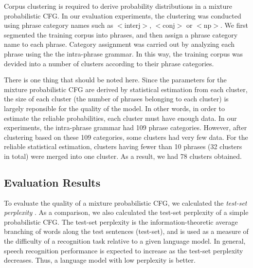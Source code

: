 Corpus clustering is required to derive probability distributions
in a mixture probabilistic CFG.
In our evaluation experiments,
the clustering was conducted using phrase category names
such as \hspace*{1mm}$<$interj$>$\hspace*{1mm}, \hspace*{1mm}$<$conj$>$\hspace*{1mm} or \hspace*{1mm}$<$np$>$\hspace*{1mm}.
We first segmented the training corpus into phrases,
and then assign a phrase category name to each phrase.
Category assignment was carried out by analyzing
each phrase using the the intra-phrase grammar.
In this way,
the training corpus was devided into a number of clusters
according to their phrase categories.

There is one thing that should be noted here.
Since the parameters for the mixture probabilistic CFG
are derived by statistical estimation from each cluster,
the size of each cluster (the number of phrases belonging to each cluster)
is largely reponsible for the quality of the model.
In other words, in order to estimate the reliable probabilities,
each cluster must have enough data.
In our experiments,
the intra-phrase grammar had 109 phrase categories.
However, after clustering based on these 109 categories,
some clusters had very few data.
For the reliable statistical estimation,
clusters having fewer than 10 phrases (32 clusters in total)
were merged into one cluster.
As a result, we had 78 clusters obtained.


\subsection{Evaluation Results}

To evaluate the quality of a mixture probabilistic CFG,
we calculated the {\em test-set perplexity} \cite{Lee89}.
As a comparison, we also calculated the test-set perplexity
of a simple probabilistic CFG.
The test-set perplexity is the information-theoretic average branching
of words along the test sentences (test-set),
and is used as a measure of the difficulty of a recognition task
relative to a given language model.
In general, speech recognition performance is expected to increase
as the test-set perplexity decreases.
Thus, a language model with low perplexity is better.


